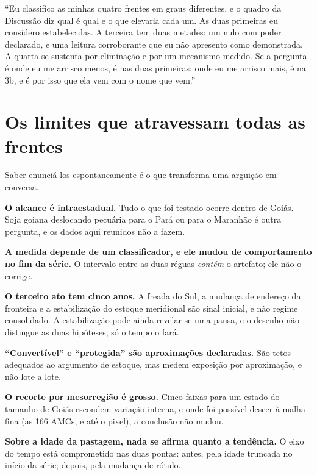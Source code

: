 \vspace{12pt}
\begin{nabanca}
``Eu classifico as minhas quatro frentes em graus diferentes, e o quadro da
Discussão diz qual é qual e o que elevaria cada um. As duas primeiras eu
considero estabelecidas. A terceira tem duas metades: um nulo com poder
declarado, e uma leitura corroborante que eu não apresento como demonstrada. A
quarta se sustenta por eliminação e por um mecanismo medido. Se a pergunta é
onde eu me arrisco menos, é nas duas primeiras; onde eu me arrisco mais, é na
3b, e é por isso que ela vem com o nome que vem.''
\end{nabanca}

\section{Os limites que atravessam todas as frentes}

Saber enunciá-los espontaneamente é o que transforma uma arguição em conversa.

\vspace{4pt}
\textbf{O alcance é intraestadual.} Tudo o que foi testado ocorre dentro de
Goiás. Soja goiana deslocando pecuária para o Pará ou para o Maranhão é outra
pergunta, e os dados aqui reunidos não a fazem.

\textbf{A medida depende de um classificador, e ele mudou de comportamento no
fim da série.} O intervalo entre as duas réguas \emph{contém} o artefato; ele
não o corrige.

\textbf{O terceiro ato tem cinco anos.} A freada do Sul, a mudança de endereço da
fronteira e a estabilização do estoque meridional são sinal inicial, e não regime
consolidado. A estabilização pode ainda revelar-se uma pausa, e o desenho não
distingue as duas hipóteses; só o tempo o fará.

\textbf{``Convertível'' e ``protegida'' são aproximações declaradas.} São tetos
adequados ao argumento de estoque, mas medem exposição por aproximação, e não
lote a lote.

\textbf{O recorte por mesorregião é grosso.} Cinco faixas para um estado do
tamanho de Goiás escondem variação interna, e onde foi possível descer à
malha fina (as 166 AMCs, e até o pixel), a conclusão não mudou.

\textbf{Sobre a idade da pastagem, nada se afirma quanto a tendência.} O eixo do
tempo está comprometido nas duas pontas: antes, pela idade truncada no início da
série; depois, pela mudança de rótulo.

